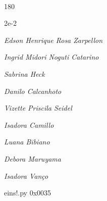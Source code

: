 \documentclass[12pt]{article}
\begin{document}
	\hfill	  	  


\pagebreak			

	\ 
	\vfill
	\begin{turn}{180}	
		\begin{minipage}{\textwidth}
		  	\ttfamily %
			\centering
			{\Huge 2e-2}
		  
			\hfill
		  
			

\textit{\small Edson Henrique Rosa Zarpellon}

\textit{\small Ingrid Midori Noguti Catarino}

\textit{\small Sabrina Heck}

\textit{\small Danilo Calcanhoto}

\textit{\small Vizette Priscila Seidel}

\textit{\small Isadora Camillo}

\textit{\small Luana Bibiano}

\textit{\small Debora Maruyama}

\textit{\small Isadora Vanço}

\bigskip

eins!.py
0x0035


		\end{minipage}	
	\end{turn}
	\vfill
	\

\pagebreak
\end{document}
